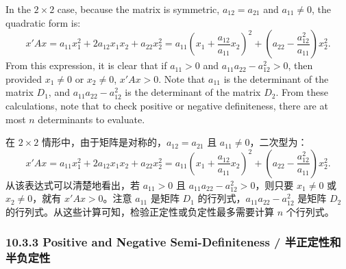 \begin{original}
In the $2 \times 2$ case, because the matrix is symmetric, $a_{12} = a_{21}$ and $a_{11} \neq 0$, the quadratic form is:
\[
x'Ax = a_{11}x_1^2 + 2a_{12}x_1x_2 + a_{22}x_2^2 = a_{11}\left(x_1 + \frac{a_{12}}{a_{11}}x_2\right)^2 + \left(a_{22} - \frac{a_{12}^2}{a_{11}}\right)x_2^2.
\]
From this expression, it is clear that if $a_{11} > 0$ and $a_{11}a_{22} - a_{12}^2 > 0$, then provided $x_1 \neq 0$ or $x_2 \neq 0$, $x'Ax > 0$. Note that $a_{11}$ is the determinant of the matrix $D_1$, and $a_{11}a_{22} - a_{12}^2$ is the determinant of the matrix $D_2$. From these calculations, note that to check positive or negative definiteness, there are at most $n$ determinants to evaluate.
\end{original}
\begin{translation}
在 $2 \times 2$ 情形中，由于矩阵是对称的，$a_{12} = a_{21}$ 且 $a_{11} \neq 0$，二次型为：
\[
x'Ax = a_{11}x_1^2 + 2a_{12}x_1x_2 + a_{22}x_2^2 = a_{11}\left(x_1 + \frac{a_{12}}{a_{11}}x_2\right)^2 + \left(a_{22} - \frac{a_{12}^2}{a_{11}}\right)x_2^2.
\]
从该表达式可以清楚地看出，若 $a_{11} > 0$ 且 $a_{11}a_{22} - a_{12}^2 > 0$，则只要 $x_1 \neq 0$ 或 $x_2 \neq 0$，就有 $x'Ax > 0$。注意 $a_{11}$ 是矩阵 $D_1$ 的行列式，$a_{11}a_{22} - a_{12}^2$ 是矩阵 $D_2$ 的行列式。从这些计算可知，检验正定性或负定性最多需要计算 $n$ 个行列式。
\end{translation}

\subsubsection{10.3.3 Positive and Negative Semi-Definiteness / 半正定性和半负定性}

